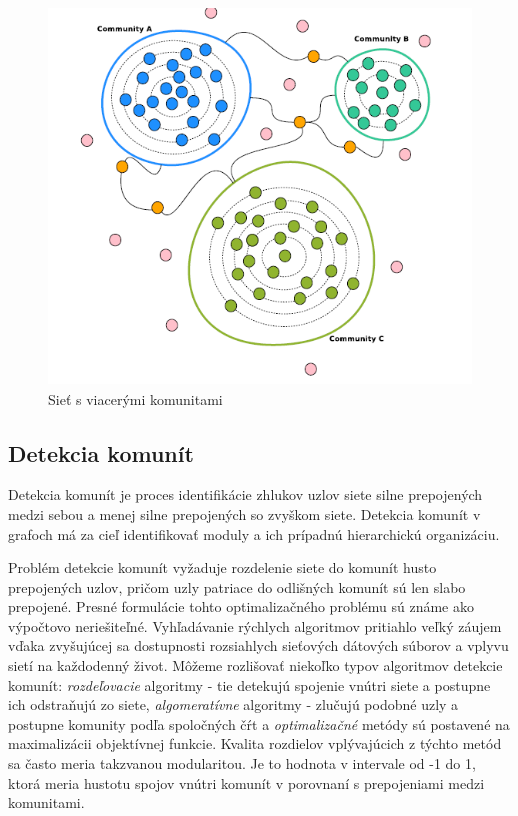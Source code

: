 \documentclass[slovak,master,public,dept460,male,cpdeclaration,oneside]{diploma}
\begin{document}
\begin{figure}[H]
\centering
\includegraphics[width=12cm,height=10cm]{figures/comunities}
\caption{Sieť s viacerými komunitami}
\end{figure}


\subsection{Detekcia komunít}
Detekcia komunít je proces identifikácie zhlukov uzlov siete silne prepojených medzi sebou a menej silne prepojených so zvyškom siete. Detekcia komunít v grafoch má za cieľ identifikovať moduly a ich prípadnú hierarchickú organizáciu.


Problém detekcie komunít vyžaduje  rozdelenie siete do komunít husto prepojených uzlov, pričom uzly patriace do odlišných komunít sú len slabo prepojené. Presné formulácie tohto optimalizačného problému sú známe ako výpočtovo neriešiteľné. Vyhľadávanie rýchlych algoritmov pritiahlo veľký záujem vďaka zvyšujúcej sa dostupnosti rozsiahlych sieťových dátových súborov a vplyvu sietí na každodenný život. Môžeme rozlišovať niekoľko typov algoritmov detekcie komunít: \textit{rozdeľovacie} algoritmy - tie detekujú spojenie vnútri siete a postupne ich odstraňujú zo siete, \textit{algomeratívne} algoritmy - zlučujú podobné uzly a postupne komunity podľa spoločných čŕt a \textit{optimalizačné} metódy sú postavené na maximalizácii objektívnej funkcie. Kvalita rozdielov vplývajúcich z týchto metód sa často meria takzvanou modularitou. Je to hodnota v intervale od -1 do 1, ktorá meria hustotu spojov vnútri komunít v porovnaní s prepojeniami medzi komunitami. 
\end{document}
